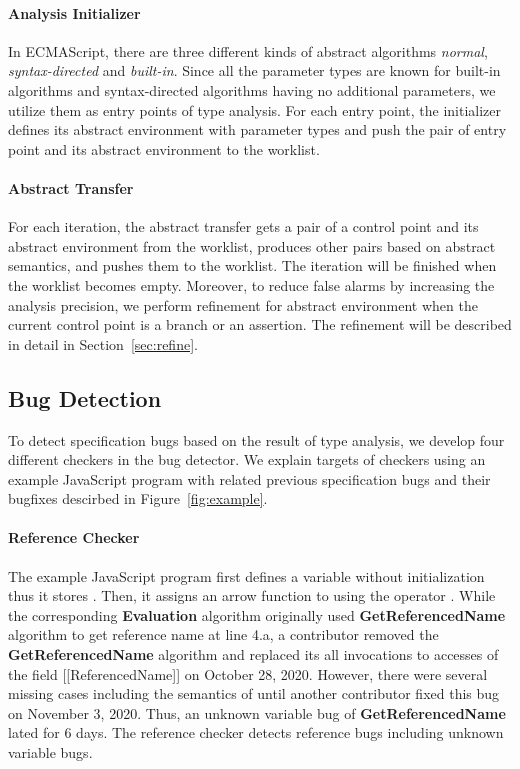\paragraph{Analysis Initializer} In ECMAScript, there are three different kinds
of abstract algorithms \textit{normal}, \textit{syntax-directed} and
\textit{built-in}.  Since all the parameter types are known for built-in
algorithms and syntax-directed algorithms having no additional parameters, we
utilize them as entry points of type analysis.  For each entry point, the
initializer defines its abstract environment with parameter types and push the
pair of entry point and its abstract environment to the worklist.

\paragraph{Abstract Transfer} For each iteration, the abstract transfer gets a
pair of a control point and its abstract environment from the worklist, produces
other pairs based on abstract semantics, and pushes them to the worklist.  The
iteration will be finished when the worklist becomes empty.  Moreover, to reduce
false alarms by increasing the analysis precision, we perform refinement for
abstract environment when the current control point is a branch or an assertion.
The refinement will be described in detail in Section~\ref{sec:refine}.


\subsection{Bug Detection}\label{sec:overview-bug-detect}

To detect specification bugs based on the result of type analysis, we develop
four different checkers in the bug detector.  We explain targets of checkers
using an example JavaScript program with related previous specification bugs and
their bugfixes descirbed in Figure~\ref{fig:example}.

\paragraph{Reference Checker} The example JavaScript program first defines a
variable  without initialization thus it stores .
Then, it assigns an arrow function to  using the operator
.  While the corresponding \textbf{Evaluation} algorithm originally
used \textbf{GetReferencedName} algorithm to get reference name at line 4.a, a
contributor removed the \textbf{GetReferencedName} algorithm and replaced its
all invocations to accesses of the field [[ReferencedName]] on October 28, 2020.
However, there were several missing cases including the semantics of
 until another contributor fixed this bug on November 3, 2020.
Thus, an unknown variable bug of \textbf{GetReferencedName} lated for 6 days.
The reference checker detects reference bugs including unknown variable bugs.

